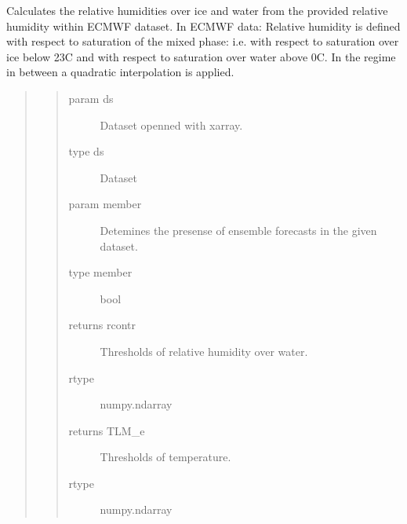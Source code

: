\documentclass[a4paper,11pt,english]{sphinxmanual}
\begin{document}
\begin{fulllineitems}
\label{\detokenize{envlib:envlib.contrail.get_relative_hum}}
\sphinxAtStartPar
Calculates the relative humidities over ice and water from the provided relative humidity within ECMWF
dataset. In ECMWF data: Relative humidity is defined with respect to saturation of the mixed phase: i.e. with
respect to saturation over ice below \sphinxhyphen{}23C and with respect to saturation over water above 0C. In the regime in
between a quadratic interpolation is applied.
\begin{quote}
\begin{quote}\begin{description}
\item[{param ds}] \leavevmode
\sphinxAtStartPar
Dataset openned with xarray.

\item[{type ds}] \leavevmode
\sphinxAtStartPar
Dataset

\item[{param member}] \leavevmode
\sphinxAtStartPar
Detemines the presense of ensemble forecasts in the given dataset.

\item[{type member}] \leavevmode
\sphinxAtStartPar
bool

\item[{returns rcontr}] \leavevmode
\sphinxAtStartPar
Thresholds of relative humidity over water.

\item[{rtype}] \leavevmode
\sphinxAtStartPar
numpy.ndarray

\item[{returns TLM\_e}] \leavevmode
\sphinxAtStartPar
Thresholds of temperature.

\item[{rtype}] \leavevmode
\sphinxAtStartPar
numpy.ndarray

\end{description}\end{quote}
\end{quote}

\end{fulllineitems}

\end{document}
